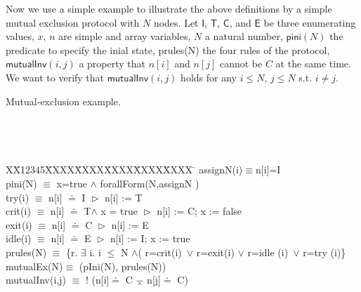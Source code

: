 \documentclass{llncs}
\newlength{\fminilength}
\newenvironment{fmini}[1][\linewidth]
  {\setlength{\fminilength}{#1\fboxsep-2\fboxrule}%
   \vspace{2ex}\noindent\begin{lrbox}{\fminibox}\begin{minipage}{\fminilength}%
   \mbox{ }\hfill\vspace{-2.5ex}}%
  {\end{minipage}\end{lrbox}\vspace{1ex}\hspace{0ex}%
   \framebox{\usebox{\fminibox}}}
\newenvironment{specification}
{\noindent\scriptsize
\tt\begin{fmini}\begin{tabbing}X\=X12345\=XXXX\=XXXX\=XXXX\=XXXX\=XXXX
\=\+\kill} {\end{tabbing}\normalfont\end{fmini}}
\def \eqc {\doteq }
\def \andc {\barwedge }
\def \negc {!}
\begin{document}
Now we use a simple example to illustrate the above definitions by a simple mutual exclusion protocol with $N$ nodes. Let $\mathsf{I}$, $\mathsf{T}$,
 $\mathsf{C}$, and  $\mathsf{E}$  be three enumerating values, $x$,    $n$ are  simple and array variables, $N$ a natural number,  $\mathsf{pini}(N)$   the predicate to specify the inial state, prules(N) the four rules of the protocol, $\mathsf{mutualInv}(i,j)$ a property that $n[i]$ and $ n[j]$ cannot be $C$ at the same time. We want to verify that $\mathsf{mutualInv}(i,j)$ holds for any $i\le N$, $j \le N$ s.t. $i \neq j$.
\vspace{-0.3cm}
\begin{example}\label{example1}Mutual-exclusion example.

\begin{specification}
assignN(i)$\equiv$n[i]=I\\
 pini(N) $\equiv$
   x=true $\wedge$  forallForm(N,assignN )\\

    try(i) $\equiv$ n[i] $\eqc$ I $\vartriangleright$ n[i] := T \\

    crit(i) $\equiv$ n[i] $\eqc$ T$\wedge$ x = true $\vartriangleright$  n[i] := C; x := false\\

%
   exit(i) $\equiv$ n[i] $\eqc$ C $\vartriangleright$ n[i] := E \\


   idle(i) $\equiv$  n[i] $\eqc$ E $\vartriangleright$ n[i] := I;  x := true
  \\%
   prules(N) $\equiv$ \{r. $\exists$ i. i $\le$ N $\wedge$( r=crit(i)~$\vee$ r=exit(i)  $\vee$ r=idle (i)~$\vee$ r=try (i)\}\\

mutualEx(N)$\equiv$ (pIni(N), prules(N))\\

mutualInv(i,j) $\equiv$
  $\negc$ (n[i]$\eqc$ C $\andc$ n[j]$\eqc$ C)\\



\end{specification}
\end{example}
\end{document}
